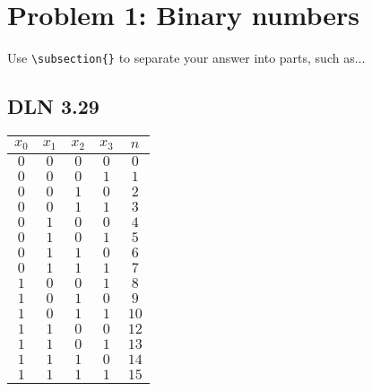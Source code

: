 \documentclass[titlepage]{article}
\begin{document}
 \maketitle

\section{Problem 1: Binary numbers}

Use \verb|\subsection{}| to separate your answer into parts, such as...

\subsection{DLN 3.29}  %

\begin{center}
\begin{tabular}{c c c c|c}
\textbf{$x_0$} & \textbf{$x_1$} & \textbf{$x_2$} & \textbf{$x_3$} & \textbf{$n$} \\ \hline
\(0\) & \(0\) & \(0\) & \(0\) & \(0\)\\
\(0\) & \(0\) & \(0\) & \(1\) & \(1\)\\
\(0\) & \(0\) & \(1\) & \(0\) & \(2\)\\
\(0\) & \(0\) & \(1\) & \(1\) & \(3\)\\
\(0\) & \(1\) & \(0\) & \(0\) & \(4\)\\
\(0\) & \(1\) & \(0\) & \(1\) & \(5\)\\
\(0\) & \(1\) & \(1\) & \(0\) & \(6\)\\
\(0\) & \(1\) & \(1\) & \(1\) & \(7\)\\
\(1\) & \(0\) & \(0\) & \(1\) & \(8\)\\
\(1\) & \(0\) & \(1\) & \(0\) & \(9\)\\
\(1\) & \(0\) & \(1\) & \(1\) & \(10\)\\
\(1\) & \(1\) & \(0\) & \(0\) & \(12\)\\
\(1\) & \(1\) & \(0\) & \(1\) & \(13\)\\
\(1\) & \(1\) & \(1\) & \(0\) & \(14\)\\
\(1\) & \(1\) & \(1\) & \(1\) & \(15\)\\

\end{tabular}
\end{center}
\end{document}
